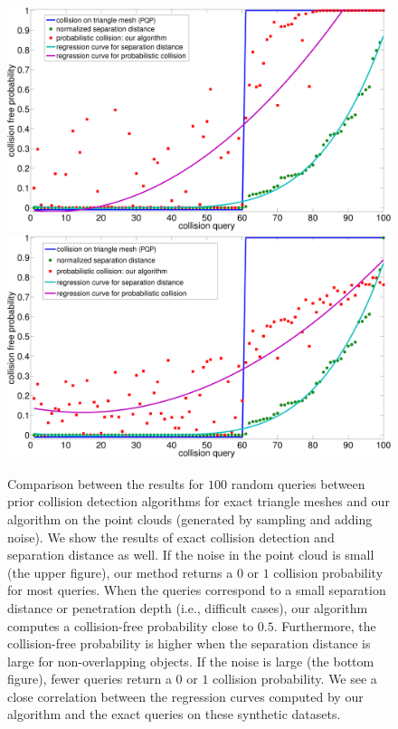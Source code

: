 \begin{figure}[htb]
  \centering
  \includegraphics[width=0.79\linewidth]{figs/7/smallnoise.pdf}
  \includegraphics[width=0.79\linewidth]{figs/7/largenoise.pdf}
  \caption[Comparison between the results for $100$ random queries between prior collision detection algorithms for exact triangle meshes and our
  algorithm on the point clouds]{\label{fig:7:res1} Comparison between the results for $100$ random queries between prior collision detection algorithms for exact triangle meshes and our
  algorithm on the point clouds (generated by sampling and adding noise). We show the results of exact collision detection and separation distance as well. If the noise in
  the point cloud is small (the upper figure), our method returns a $0$ or $1$ collision probability for most queries. When the queries correspond to a small separation distance or penetration depth (i.e., difficult cases), our algorithm computes a collision-free probability close to $0.5$.
  Furthermore, the collision-free probability is higher when the separation distance is large for non-overlapping objects. If
  the noise is large (the bottom figure), fewer queries return a $0$ or $1$ collision probability. We see a close correlation between the regression
  curves computed by our algorithm and the exact queries on these synthetic datasets.}
\end{figure}

